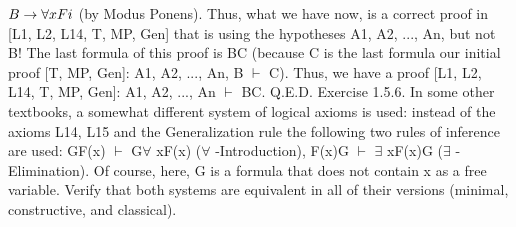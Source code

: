 \(B\rightarrow \forall xFi\) (by Modus Ponens).
Thus, what we have now, is a correct proof in [L1, L2, L14, T, MP, Gen] that is using the hypotheses A1,
A2, ..., An, but not B! The last formula of this proof is B\IMPLIES C (because C is the last formula our initial
proof [T, MP, Gen]: A1, A2, ..., An, B \(\vdash\) C). Thus, we have a proof [L1, L2, L14, T, MP, Gen]: A1, A2, ...,
An \(\vdash\) B\IMPLIES C. Q.E.D.
Exercise 1.5.6. In some other textbooks, a somewhat different system of logical axioms is used: instead
of the axioms L14, L15 and the Generalization rule the following two rules of inference are used:
G\IMPLIES F(x) \(\vdash\) G\IMPLIES \(\forall\) xF(x) (\(\forall\) -Introduction),
F(x)\IMPLIES G \(\vdash\) \(\exists\) xF(x)\IMPLIES G (\(\exists\) -Elimination).
Of course, here, G is a formula that does not contain x as a free variable. Verify that both systems are
equivalent in all of their versions (minimal, constructive, and classical).

